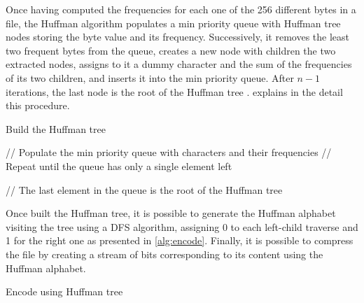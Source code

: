 Once having computed the frequencies for each one of the 256 different bytes in a file, the Huffman algorithm populates a min priority queue with Huffman tree nodes storing the byte value and its frequency. Successively, it removes the least two frequent bytes from the queue, creates a new node with children the two extracted nodes, assigns to it a dummy character and the sum of the frequencies of its two children, and inserts it into the min priority queue. After \(n-1\) iterations, the last node is the root of the Huffman tree \cite{bertossi2010algoritmi}.  explains in the detail this procedure.
\begin{algorithm}
    \caption{Build the Huffman tree}\label{alg:buildtree}

    \SetKwFor{}{}{}{}

    // Populate the min priority queue with characters and their frequencies\;
    // Repeat until the queue has only a single element left\;

    // The last element in the queue is the root of the Huffman tree\;
    \;
\end{algorithm}

Once built the Huffman tree, it is possible to generate the Huffman alphabet visiting the tree using a DFS algorithm, assigning 0 to each left-child traverse and 1 for the right one as presented in \cref{alg:encode}. Finally, it is possible to compress the file by creating a stream of bits corresponding to its content using the Huffman alphabet.

\begin{algorithm}
    \caption{Encode using Huffman tree}\label{alg:encode}
\end{algorithm}


